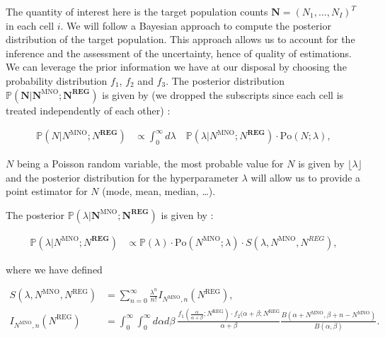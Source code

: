\documentclass[12pt, a4paper]{article}
\begin{document}
The quantity of interest here is the target population counts $\mathbf{N}=(N_{1},\dots,N_{I})^{T}$ in each cell $i$. We will follow a Bayesian
approach to compute the posterior distribution of the target population. This approach allows us to  
account for the inference and the assessment of the uncertainty, hence of quality of estimations.
We can leverage the prior information we have at our disposal by choosing the probability distribution $f_{1}$, $f_{2}$ and $f_{3}$. 
The posterior distribution $\mathbb{P}\left(\mathbf{N}\big|\mathbf{N}^{\textrm{MNO}};\mathbf{N}^{\textbf{REG}}\right)$ is given by (we dropped the subscripts
since each cell is treated independently of each other) \cite{methodology}:

\begin{align}
\mathbb{P}\left(N\big|N^{\textrm{MNO}};N^{\textbf{REG}}\right)&\propto 
\label{PostProbN} \int_{0}^{\infty}d\lambda\quad\mathbb{P}\left(\lambda\big|N^{\textrm{MNO}};N^{\textbf{REG}}\right)\cdot\textrm{Po}(N; \lambda),
\end{align}

$N$ being a Poisson random variable, the most probable value for $N$ is given by $\lfloor \lambda\rfloor$ and the posterior 
distribution for the hyperparameter $\lambda$ will allow us to provide a point estimator for $N$ (mode, mean, median, \dots).

The posterior $\mathbb{P}\left(\lambda \big|\mathbf{N}^{\textrm{MNO}};\mathbf{N}^{\textbf{REG}}\right)$ is given by \cite{BDA3} \cite{methodology}:

\begingroup\small
\begin{align}\label{Sdef1}
\mathbb{P}\left(\lambda\big|N^{\textrm{MNO}};N^{\textbf{REG}}\right)&\propto \mathbb{P}\left(\lambda\right)\cdot \textrm{Po}(N^{\textrm{MNO}}; \lambda) \cdot S\left(\lambda, N^{\textrm{MNO}}, N^{REG}\right),
\end{align}
\endgroup

\noindent where we have defined 

\begingroup\small
\begin{align}\label{Sdef2}
S(\lambda, N^{\textrm{MNO}}, N^{\textrm{REG}}) &= \sum_{n = 0}^{\infty}\frac{\lambda^{n}}{n!}I_{N^{\textrm{MNO}}, n}(N^{\textrm{REG}}),\\
I_{N^{\textrm{MNO}}, n}(N^{\textrm{REG}})&=\int_{0}^{\infty}\int_{0}^{\infty}d\alpha d\beta\ \frac{f_{1}(\frac{\alpha}{\alpha+\beta}; N^{\textrm{REG}})\cdot f_{2}(\alpha+\beta; N^{\textrm{REG}}}{\alpha+\beta}\frac{B\left(\alpha+N^{\textrm{MNO}}, \beta+n- N^{\textrm{MNO}}\right)}{B\left(\alpha, \beta\right)}.
\end{align}
\endgroup
\end{document}
